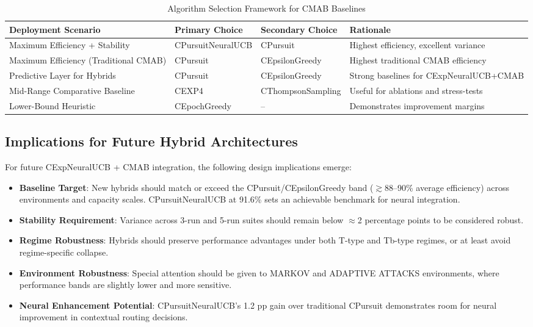\documentclass[12pt,a4paper]{article}
\begin{document}
\begin{table}[H]
\footnotesize
\centering
\caption{Algorithm Selection Framework for CMAB Baselines}
\begin{tabular}{|l|l|l|l|}
\hline
\textbf{Deployment Scenario} & \textbf{Primary Choice} & \textbf{Secondary Choice} & \textbf{Rationale} \\
\hline
\hline
Maximum Efficiency + Stability & CPursuitNeuralUCB & CPursuit & Highest efficiency, excellent variance \\
Maximum Efficiency (Traditional CMAB) & CPursuit & CEpsilonGreedy & Highest traditional CMAB efficiency \\
Predictive Layer for Hybrids   & CPursuit & CEpsilonGreedy & Strong baselines for CExpNeuralUCB+CMAB \\
Mid-Range Comparative Baseline & CEXP4    & CThompsonSampling & Useful for ablations and stress-tests \\
Lower-Bound Heuristic          & CEpochGreedy & --           & Demonstrates improvement margins \\
\hline
\end{tabular}
\end{table}

\subsection{Implications for Future Hybrid Architectures}

For future CExpNeuralUCB + CMAB integration, the following design implications emerge:

\begin{itemize}
\item \textbf{Baseline Target}: New hybrids should match or exceed the CPursuit/CEpsilonGreedy band ($\gtrsim$88–90\% average efficiency) across environments and capacity scales. CPursuitNeuralUCB at 91.6\% sets an achievable benchmark for neural integration.
\item \textbf{Stability Requirement}: Variance across 3-run and 5-run suites should remain below $\approx$2 percentage points to be considered robust.
\item \textbf{Regime Robustness}: Hybrids should preserve performance advantages under both T-type and Tb-type regimes, or at least avoid regime-specific collapse.
\item \textbf{Environment Robustness}: Special attention should be given to MARKOV and ADAPTIVE ATTACKS environments, where performance bands are slightly lower and more sensitive.
\item \textbf{Neural Enhancement Potential}: CPursuitNeuralUCB's 1.2 pp gain over traditional CPursuit demonstrates room for neural improvement in contextual routing decisions.
\end{itemize}
\end{document}
